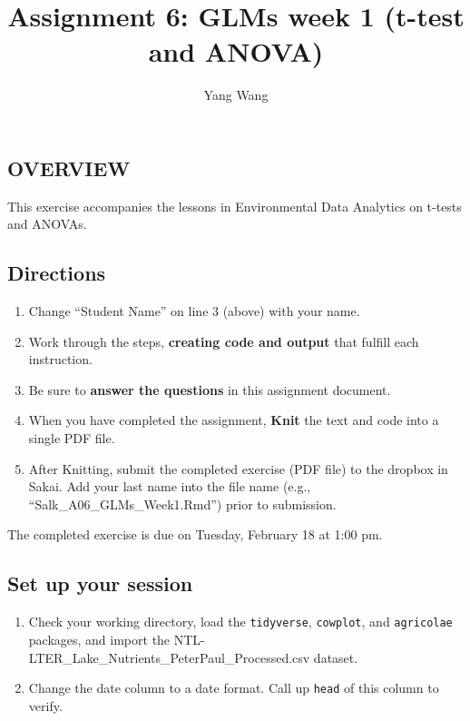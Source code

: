 \documentclass[]{article}
\title{Assignment 6: GLMs week 1 (t-test and ANOVA)}
\author{Yang Wang}
\date{}
\providecommand{\tightlist}{%
  \setlength{\itemsep}{0pt}\setlength{\parskip}{0pt}}
\begin{document}
\maketitle

\hypertarget{overview}{%
\subsection{OVERVIEW}\label{overview}}

This exercise accompanies the lessons in Environmental Data Analytics on
t-tests and ANOVAs.

\hypertarget{directions}{%
\subsection{Directions}\label{directions}}

\begin{enumerate}
\def\labelenumi{\arabic{enumi}.}
\tightlist
\item
  Change ``Student Name'' on line 3 (above) with your name.
\item
  Work through the steps, \textbf{creating code and output} that fulfill
  each instruction.
\item
  Be sure to \textbf{answer the questions} in this assignment document.
\item
  When you have completed the assignment, \textbf{Knit} the text and
  code into a single PDF file.
\item
  After Knitting, submit the completed exercise (PDF file) to the
  dropbox in Sakai. Add your last name into the file name (e.g.,
  ``Salk\_A06\_GLMs\_Week1.Rmd'') prior to submission.
\end{enumerate}

The completed exercise is due on Tuesday, February 18 at 1:00 pm.

\hypertarget{set-up-your-session}{%
\subsection{Set up your session}\label{set-up-your-session}}

\begin{enumerate}
\def\labelenumi{\arabic{enumi}.}
\item
  Check your working directory, load the \texttt{tidyverse},
  \texttt{cowplot}, and \texttt{agricolae} packages, and import the
  NTL-LTER\_Lake\_Nutrients\_PeterPaul\_Processed.csv dataset.
\item
  Change the date column to a date format. Call up \texttt{head} of this
  column to verify.
\end{enumerate}
\end{document}
